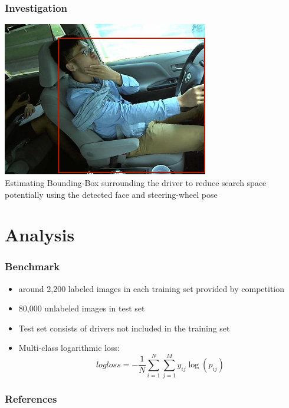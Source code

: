 \documentclass{beamer}
\begin{document}
    \begin{frame}
		\frametitle{Investigation}
        \begin{center}
        \includegraphics[width=9cm]{images/BoundingBox.jpg}\\
        Estimating Bounding-Box surrounding the driver to reduce search space potentially using the detected face and steering-wheel pose\end{center}
    \end{frame}

	
	\section{Analysis}	
	\begin{frame}
		\frametitle{Benchmark}
		\begin{itemize}
			\item around 2,200 labeled images in each training set provided by competition
			\item 80,000 unlabeled images in test set
			\item Test set consists of drivers not included in the training set
			\item Multi-class logarithmic loss: $$logloss = - \frac{1}{N} \sum_{i=1}^N \sum_{j=1}^M y_{ij} \log (p_{ij})$$
			
		\end{itemize}
		


	\end{frame}

		
		


		
		\begin{frame}[allowframebreaks]
			\frametitle{References} 
			\nocite{*} 
			 
			 
		\end{frame}
		
		\medskip	
		

	
		
\end{document}

